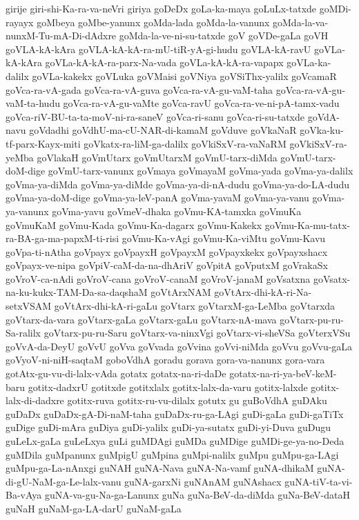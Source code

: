{girije
giri-shi-Ka-ra-va-neVri
giriya
goDeDx
goLa-ka-maya
goLuLx-tatxde
goMDi-rayayx
goMbeya
goMbe-yanunx
goMda-lada
goMda-la-vanunx
goMda-la-va-nunxM-Tu-mA-Di-dAdxre
goMda-la-ve-ni-su-tatxde
goV
goVDe-gaLa
goVH
goVLA-kA-kAra
goVLA-kA-kA-ra-mU-tiR-yA-gi-hudu
goVLA-kA-ravU
goVLa-kA-kAra
goVLa-kA-kA-ra-parx-Na-vada
goVLa-kA-kA-ra-vapapx
goVLa-ka-dalilx
goVLa-kakekx
goVLuka
goVMaisi
goVNiya
goVSiThx-yalilx
goVcamaR
goVca-ra-vA-gada
goVca-ra-vA-guva
goVca-ra-vA-gu-vaM-taha
goVca-ra-vA-gu-vaM-ta-hudu
goVca-ra-vA-gu-vaMte
goVca-ravU
goVca-ra-ve-ni-pA-tamx-vadu
goVca-riV-BU-ta-ta-moV-ni-ra-saneV
goVca-ri-sanu
goVca-ri-su-tatxde
goVdA-navu
goVdadhi
goVdhU-ma-cU-NAR-di-kamaM
goVduve
goVkaNaR
goVka-ku-tf-parx-Kayx-miti
goVkatx-ra-liM-ga-dalilx
goVkiSxV-ra-vaNaRM
goVkiSxV-ra-yeMba
goVlakaH
goVmUtarx
goVmUtarxM
goVmU-tarx-diMda
goVmU-tarx-doM-dige
goVmU-tarx-vanunx
goVmaya
goVmayaM
goVma-yada
goVma-ya-dalilx
goVma-ya-diMda
goVma-ya-diMde
goVma-ya-di-nA-dudu
goVma-ya-do-LA-dudu
goVma-ya-doM-dige
goVma-ya-leV-panA
goVma-yavaM
goVma-ya-vanu
goVma-ya-vanunx
goVma-yavu
goVmeV-dhaka
goVmu-KA-tamxka
goVmuKa
goVmuKaM
goVmu-Kada
goVmu-Ka-dagarx
goVmu-Kakekx
goVmu-Ka-mu-tatx-ra-BA-ga-ma-papxM-ti-risi
goVmu-Ka-vAgi
goVmu-Ka-viMtu
goVmu-Kavu
goVpa-ti-nAtha
goVpayx
goVpayxH
goVpayxM
goVpayxkekx
goVpayxshacx
goVpayx-ve-nipa
goVpiV-caM-da-na-dhAriV
goVpitA
goVputxM
goVrakaSx
goVroV-ca-nAdi
goVroV-cana
goVroV-canaM
goVroV-janaM
goVsatxna
goVsatx-na-ku-kukx-TAM-Da-sa-daqshaM
goVtArxNAM
goVtArx-dhi-kA-ri-Na-setxVSAM
goVtArx-dhi-kA-ri-gaLu
goVtarx
goVtarxM-ga-LeMba
goVtarxda
goVtarx-da-vara
goVtarx-gaLa
goVtarx-gaLu
goVtarx-nA-mava
goVtarx-pu-ru-Sa-ralilx
goVtarx-pu-ru-Saru
goVtarx-va-ninxVgi
goVtarx-vi-sheVSa
goVterxVSu
goVvA-da-DeyU
goVvU
goVva
goVvada
goVvina
goVvi-niMda
goVvu
goVvu-gaLa
goVyoV-ni-niH-saqtaM
goboVdhA
goradu
gorava
gora-va-nanunx
gora-vara
gotAtx-gu-vu-di-lalx-vAda
gotatx
gotatx-na-ri-daDe
gotatx-na-ri-ya-beV-keM-baru
gotitx-dadxrU
gotitxde
gotitxlalx
gotitx-lalx-da-varu
gotitx-lalxde
gotitx-lalx-di-dadxre
gotitx-ruva
gotitx-ru-vu-dilalx
gotutx
gu
guBoVdhA
guDAku
guDaDx
guDaDx-gA-Di-naM-taha
guDaDx-ru-ga-LAgi
guDi-gaLa
guDi-gaTiTx
guDige
guDi-mAra
guDiya
guDi-yalilx
guDi-ya-sutatx
guDi-yi-Duva
guDugu
guLeLx-gaLa
guLeLxya
guLi
guMDAgi
guMDa
guMDige
guMDi-ge-ya-no-Deda
guMDila
guMpanunx
guMpigU
guMpina
guMpi-nalilx
guMpu
guMpu-ga-LAgi
guMpu-ga-La-nAnxgi
guNAH
guNA-Nava
guNA-Na-vamf
guNA-dhikaM
guNA-di-gU-NaM-ga-Le-lalx-vanu
guNA-garxNi
guNAnAM
guNAshacx
guNA-tiV-ta-vi-Ba-vAya
guNA-va-gu-Na-ga-Lanunx
guNa
guNa-BeV-da-diMda
guNa-BeV-dataH
guNaH
guNaM-ga-LA-darU
guNaM-gaLa
}
